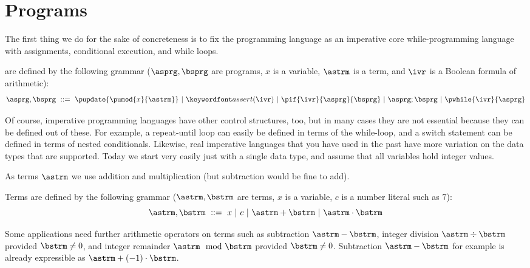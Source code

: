 \documentclass[11pt,twoside]{scrartcl}
\begin{document}
\section{Programs}

The first thing we do for the sake of concreteness is to fix the programming language as an imperative core while-programming language with assignments, conditional execution, and while loops.

\begin{definition}[Program] \label{def:deterministic-program}
 are defined by the following grammar ($\asprg,\bsprg$ are programs, $x$ is a variable, $\astrm$ is a term, and $\ivr$ is a Boolean formula of arithmetic):%
\indexn{\cup}\indexn{;}\indexn{{}^*}\indexn{{:}{=}}\index{\ptest{\ivr}}%
\begin{equation*}
  \asprg,\bsprg ~\bebecomes~
  \pupdate{\pumod{x}{\astrm}}
  \alternative
  \passert{\ivr}
  \alternative
  \pif{\ivr}{\asprg}{\bsprg}
  \alternative
  \asprg;\bsprg
  \alternative
  \pwhile{\ivr}{\asprg}
\end{equation*}
\end{definition}

Of course, imperative programming languages have other control structures, too, but in many cases they are not essential because they can be defined out of these.
For example, a repeat-until loop can easily be defined in terms of the while-loop, and a switch statement can be defined in terms of nested conditionals.
Likewise, real imperative languages that you have used in the past have more variation on the data types that are supported.
Today we start very easily just with a single data type, and assume that all variables hold integer values.

As terms $\astrm$ we use addition and multiplication (but subtraction would be fine to add).

\begin{definition}[Terms]
\label{def:term-syntax}
Terms are defined by the following grammar ($\astrm,\bstrm$ are terms, $x$ is a variable, $c$ is a number literal such as $7$):
\[
  \astrm,\bstrm ~\bebecomes~
  x
  \alternative
  c
  \alternative
  \astrm+\bstrm
  \alternative
  \astrm\cdot\bstrm
\]
\end{definition}
Some applications need further arithmetic operators on terms such as subtraction $\astrm-\bstrm$, integer division \(\astrm\div\bstrm\) provided $\bstrm\neq0$, and integer remainder \(\astrm\mod\bstrm\) provided $\bstrm\neq0$.
Subtraction \(\astrm-\bstrm\) for example is already expressible as \(\astrm+(-1)\cdot\bstrm\).
\end{document}
